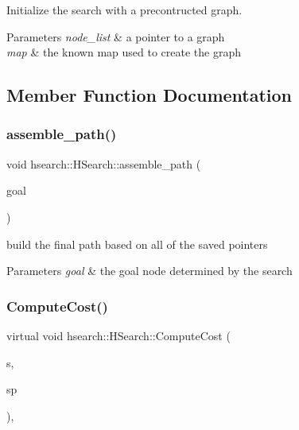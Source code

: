 Initialize the search with a precontructed graph. 


\begin{DoxyParams}{Parameters}
{\em node\+\_\+list} & a pointer to a graph \\
\hline
{\em map} & the known map used to create the graph \\
\hline
\end{DoxyParams}


\subsection{Member Function Documentation}
\mbox{\label{classhsearch_1_1HSearch_ac94c08c0f0d4cc3076f01d70c6cd7679}} 
\subsubsection{\texorpdfstring{assemble\+\_\+path()}{assemble\_path()}}
{\footnotesize\ttfamily void hsearch\+::\+H\+Search\+::assemble\+\_\+path (\begin{DoxyParamCaption}\item[{\hyperlink{structhsearch_1_1SearchNode}{Search\+Node}}]{goal }\end{DoxyParamCaption})\hspace{0.3cm}{\ttfamily [protected]}}



build the final path based on all of the saved pointers 


\begin{DoxyParams}{Parameters}
{\em goal} & the goal node determined by the search \\
\hline
\end{DoxyParams}
\mbox{\label{classhsearch_1_1HSearch_a5d325955c4faedaca0c68155fd1f7e69}} 
\subsubsection{\texorpdfstring{Compute\+Cost()}{ComputeCost()}}
{\footnotesize\ttfamily virtual void hsearch\+::\+H\+Search\+::\+Compute\+Cost (\begin{DoxyParamCaption}\item[{\hyperlink{structhsearch_1_1SearchNode}{Search\+Node} \&}]{s,  }\item[{\hyperlink{structhsearch_1_1SearchNode}{Search\+Node} \&}]{sp }\end{DoxyParamCaption})\hspace{0.3cm}{\ttfamily [protected]}, {}}



